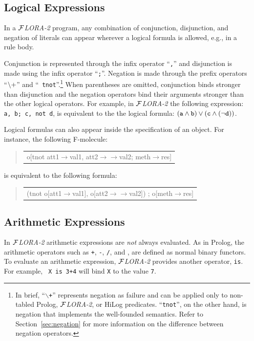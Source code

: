 \documentclass[11pt]{article}
\newenvironment{qrules}{\begin{quote}\tt\begin{tabular}[t]{l}}%
{\end{tabular}\end{quote}}
\newcommand{\fd}{\ensuremath{{\rightarrow}}}                   %
\newcommand{\mvd}{\ensuremath{{\rightarrow\!\!\!\!\rightarrow}}}  %
\newcommand{\FLORA}{{\mbox{${\cal F}${\small\it LORA}\rm\emph{-2}}}\xspace}
\newcommand{\NAF}{{$\tt\backslash +$}\xspace}
\begin{document}
\subsection{Logical Expressions}


%
In a \FLORA program, any combination of conjunction, disjunction, and
negation of literals can appear wherever a logical formula is allowed,
e.g., in a rule body.

Conjunction is represented through the infix operator ``{\tt ,}'' and
disjunction is made using the infix operator ``{\tt ;}''.  Negation is made
through the prefix operators ``\NAF'' and ``{\tt
  tnot}''.\footnote{
  In brief, ``{\tt $\backslash$+}'' represents negation as
  failure and can be applied only to non-tabled Prolog, \FLORA, or HiLog
  predicates. ``{\tt tnot}'', on the other hand, is negation that
  implements the well-founded semantics.  Refer to
  Section~\ref{sec:negation} for more information on the difference between
  negation operators. 
  }
When parentheses are omitted, conjunction binds stronger than disjunction
and the negation operators bind their arguments stronger than the other
logical operators.  For example, in \FLORA the following expression:
\verb|a, b; c, not d|, is equivalent to the the logical formula: $\tt (a
\wedge b) \vee (c \wedge (\neg d))$.

%
Logical formulas can also appear inside the specification of an object. For
instance, the following F-molecule:
\begin{qrules}
o[tnot att1{\fd}val1, att2{\mvd}val2; meth{\fd}res]
\end{qrules}
is equivalent to the following formula:
\begin{qrules}
(tnot o[att1{\fd}val1], o[att2{\mvd}val2]) ; o[meth{\fd}res]
\end{qrules}


\subsection{Arithmetic Expressions}


In \FLORA arithmetic expressions are \emph{not} always evaluated. As in
Prolog, the arithmetic operators such as {\tt +}, {\tt -}, {\tt /}, and
{\tt *}, are defined as normal binary functors. To evaluate an arithmetic
expression, \FLORA provides another operator, {\tt is}.  For example, {\tt
  X is 3+4} will bind {\tt X} to the value {\tt 7}.
\end{document}
